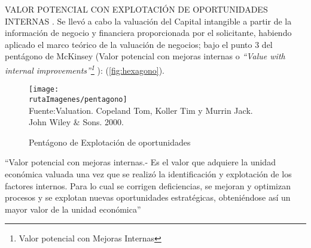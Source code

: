 \textcolor{secundario}{VALOR POTENCIAL CON EXPLOTACI\'ON DE OPORTUNIDADES INTERNAS
.} Se llev\'o a cabo la valuaci\'on del Capital intangible a partir de la informaci\'on de negocio y financiera proporcionada por el solicitante, habiendo aplicado el marco
te\'orico de la valuaci\'on de negocios; bajo el punto 3 del pent\'agono de McKinsey (Valor potencial con mejoras internas o \textit{``Value with internal improvements''\footnote{Valor potencial con Mejoras Internas}} ): (\textcolor{terciario}{\autoref{fig:hexagono}}).

\begin{figure}[H]
\centering
\caption{Pent\'agono de Explotaci\'on de oportunidades\label{fig:hexagono}}
\texttt{[image: \\rutaImagenes/pentagono]}\\
Fuente:Valuation. Copeland Tom, Koller Tim y Murrin Jack.\\

John Wiley \& Sons. 2000.
\end{figure}

``\textcolor{secundario}{Valor potencial con mejoras internas}.- Es el valor que adquiere la unidad econ\'omica valuada una vez que se realiz\'o la identificaci\'on y explotaci\'on de los factores internos. Para lo cual se corrigen deficiencias, se mejoran y optimizan procesos y se explotan nuevas oportunidades estrat\'egicas, obteni\'endose as\'i un mayor valor de la unidad econ\'omica''\\

